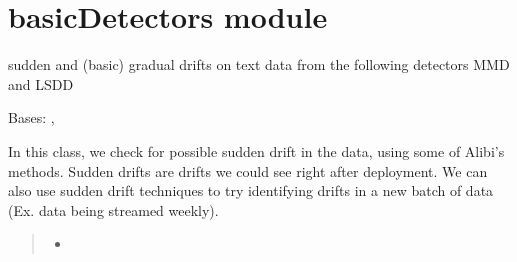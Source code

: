 \documentclass[letterpaper,10pt,english]{sphinxmanual}
\begin{document}
\section{basicDetectors module}
\label{\detokenize{alibiModules/basicDetectors:module-basicDetectors}}\label{\detokenize{alibiModules/basicDetectors:basicdetectors-module}}\label{\detokenize{alibiModules/basicDetectors::doc}}
\sphinxAtStartPar
sudden and (basic) gradual drifts on text data from the following detectors \sphinxhyphen{} MMD and LSDD

\begin{fulllineitems}
\label{\detokenize{alibiModules/basicDetectors:basicDetectors.basicDetectors}}
\pysigstartsignatures
{}
\pysigstopsignatures
\sphinxAtStartPar
Bases: {\hyperref[\detokenize{baseModules/sampling:sampling.samplingData}]{}}, {\hyperref[\detokenize{baseModules/base:base.detectorParent}]{}}

\begin{fulllineitems}
\label{\detokenize{alibiModules/basicDetectors:basicDetectors.basicDetectors.__init__}}
\pysigstartsignatures
{}
\pysigstopsignatures
\sphinxAtStartPar
In this class, we check for possible sudden drift in the data, using some of Alibi’s methods.
Sudden drifts are drifts we could see right after deployment.
We can also use sudden drift techniques to try identifying drifts in
a new batch of data (Ex. data being streamed weekly).
\begin{quote}\begin{description}
\sphinxAtStartPar
\begin{itemize}
\item {} 
\sphinxAtStartPar
{}


\end{itemize}
\end{description}
\end{quote}
\end{fulllineitems}
\end{fulllineitems}
\end{document}
